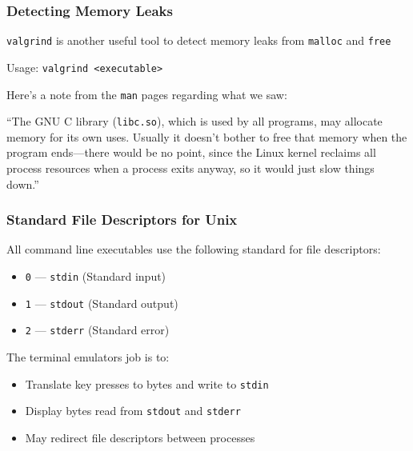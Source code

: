   \begin{frame}
    \frametitle{Detecting Memory Leaks}

    \texttt{valgrind} is another useful tool to detect memory leaks from
    \texttt{malloc} and \texttt{free}

    \hspace{1em} Usage: \texttt{valgrind <executable>}

    \vspace{2em}

    Here's a note from the \texttt{man} pages regarding what we saw:

    \vspace{1em}

    ``The GNU C library (\texttt{libc.so}), which is used by all programs,
      may allocate memory for its own uses. Usually it doesn't bother to free
      that memory when the program ends—there would be no point, since the Linux
      kernel reclaims all process resources when a process exits anyway, so it
      would just slow things down.''

    \vspace{2em}

  \end{frame}

  \begin{frame}
    \frametitle{Standard File Descriptors for Unix}

    All command line executables use the following standard for file
    descriptors:

    \begin{itemize}
      \item \texttt{0} --- \texttt{stdin} (Standard input)
      \item \texttt{1} --- \texttt{stdout} (Standard output)
      \item \texttt{2} --- \texttt{stderr} (Standard error)
    \end{itemize}

    \vspace{2em}

    The terminal emulators job is to:
    \begin{itemize}
      \item Translate key presses to bytes and write to \texttt{stdin}
      \item Display bytes read from \texttt{stdout} and \texttt{stderr}
      \item May redirect file descriptors between processes
    \end{itemize}
  \end{frame}

